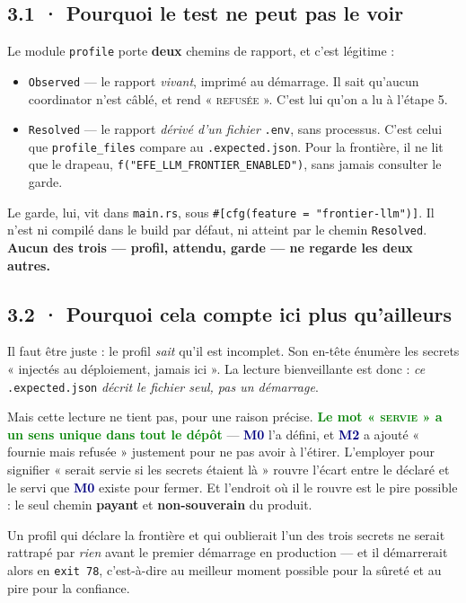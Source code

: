 \documentclass[10pt]{article}
\newcommand{\best}[1]{\textcolor{green}{\textbf{#1}}}
\newcommand{\code}[1]{\texttt{\small #1}}
\newcommand{\mm}[1]{\textbf{\textcolor{navy}{#1}}}
\begin{document}
\subsection{3.1 · Pourquoi le test ne peut pas le voir}

Le module \code{profile} porte \textbf{deux} chemins de rapport, et c'est légitime :

\begin{itemize}[leftmargin=1.2em,itemsep=1.5pt,topsep=2pt]
\item \code{Observed} --- le rapport \emph{vivant}, imprimé au démarrage. Il sait qu'aucun
      coordinator n'est câblé, et rend « \textsc{refusée} ». C'est lui qu'on a lu à l'étape 5.
\item \code{Resolved} --- le rapport \emph{dérivé d'un fichier} \code{.env}, sans processus. C'est
      celui que \code{profile\_files} compare au \code{.expected.json}. Pour la frontière, il ne lit
      que le drapeau, \code{f("EFE\_LLM\_FRONTIER\_ENABLED")}, sans jamais consulter le garde.
\end{itemize}

Le garde, lui, vit dans \code{main.rs}, sous \code{\#[cfg(feature = "frontier-llm")]}. Il n'est ni
compilé dans le build par défaut, ni atteint par le chemin \code{Resolved}. \textbf{Aucun des trois
--- profil, attendu, garde --- ne regarde les deux autres.}

\subsection{3.2 · Pourquoi cela compte ici plus qu'ailleurs}

Il faut être juste : le profil \emph{sait} qu'il est incomplet. Son en-tête énumère les secrets
« injectés au déploiement, jamais ici ». La lecture bienveillante est donc : \emph{ce}
\code{.expected.json} \emph{décrit le fichier seul, pas un démarrage}.

Mais cette lecture ne tient pas, pour une raison précise. \best{Le mot « \textsc{servie} » a un sens
unique dans tout le dépôt} --- \mm{M0} l'a défini, et \mm{M2} a ajouté « fournie mais refusée »
justement pour ne pas avoir à l'étirer. L'employer pour signifier « serait servie si les secrets
étaient là » rouvre l'écart entre le déclaré et le servi que \mm{M0} existe pour fermer. Et
l'endroit où il le rouvre est le pire possible : le seul chemin \textbf{payant} et
\textbf{non-souverain} du produit.

Un profil qui déclare la frontière et qui oublierait l'un des trois secrets ne serait rattrapé par
\emph{rien} avant le premier démarrage en production --- et il démarrerait alors en \code{exit 78},
c'est-à-dire au meilleur moment possible pour la sûreté et au pire pour la confiance.
\end{document}
